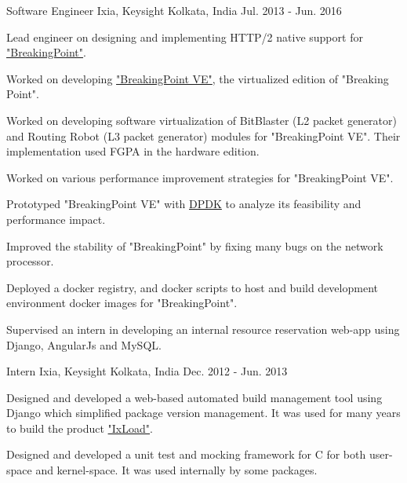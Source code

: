 \begin{cventries}
  \cventry
    {Software Engineer} %
    {Ixia, Keysight} %
    {Kolkata, India} %
    {Jul. 2013 - Jun. 2016} %
    {\begin{cvitems} %
        \item {Lead engineer on designing and implementing HTTP/2 native support for \href{https://www.keysight.com/th/en/products/network-security/breakingpoint.html}{"BreakingPoint"}.}
        \item {Worked on developing \href{https://www.keysight.com/th/en/products/network-security/breakingpoint-ve.html}{"BreakingPoint VE"}, the virtualized edition of "Breaking Point".}
        \item {Worked on developing software virtualization of BitBlaster (L2 packet generator) and Routing Robot (L3 packet generator) modules for "BreakingPoint VE". Their implementation used FGPA in the hardware edition.}
        \item {Worked on various performance improvement strategies for "BreakingPoint VE".}
        \item {Prototyped "BreakingPoint VE" with \href{https://www.dpdk.org/}{DPDK} to analyze its feasibility and performance impact.}
        \item {Improved the stability of "BreakingPoint" by fixing many bugs on the network processor.}
        \item {Deployed a docker registry, and docker scripts to host and build development environment docker images for "BreakingPoint".}
        \item {Supervised an intern in developing an internal resource reservation web-app using Django, AngularJs and MySQL.}
      \end{cvitems}}

  \cventry
    {Intern} %
    {Ixia, Keysight} %
    {Kolkata, India} %
    {Dec. 2012 - Jun. 2013} %
    {\begin{cvitems} %
        \item {Designed and developed a web-based automated build management tool using Django which simplified package version management. It was used for many years to build the product \href{https://www.keysight.com/th/en/products/network-test/protocol-load-test/ixload.html}{"IxLoad"}.}
        \item {Designed and developed a unit test and mocking framework for C for both user-space and kernel-space. It was used internally by some packages.}
      \end{cvitems}}

\end{cventries}
